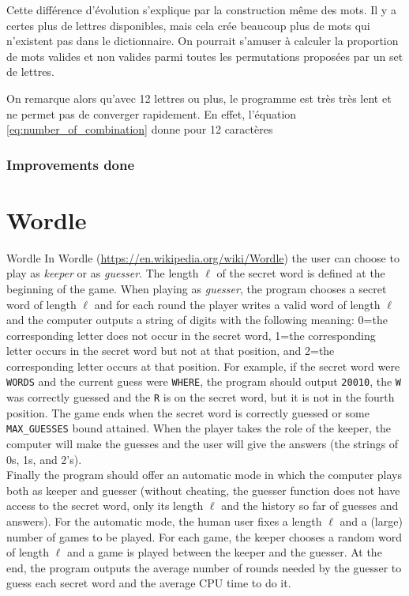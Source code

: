 \documentclass[10pt,a4paper,hidelinks]{article}
\begin{document}

Cette différence d'évolution s'explique par la construction même des mots. Il y a certes plus de lettres disponibles, mais cela crée beaucoup plus de mots qui n'existent pas dans le dictionnaire. On pourrait s'amuser à calculer la proportion de mots valides et non valides parmi toutes les permutations proposées par un set de lettres.

On remarque alors qu'avec 12 lettres ou plus, le programme est très très lent et ne permet pas de converger rapidement. En effet, l'équation \ref{eq:number_of_combination} donne pour 12 caractères 
\subsubsection{Improvements done}

\section{Wordle}
\begin{exercise_description}{Wordle}
    In Wordle (\url{https://en.wikipedia.org/wiki/Wordle}) the user can choose to play as \textit{keeper} or as \textit{guesser}. The length $\ell$ of the secret word is defined at the beginning of the game. When playing as \textit{guesser}, the program chooses a secret word of length $\ell$ and for each round the player writes a valid word of length $\ell$ and the computer outputs a string of digits with the following meaning: 0=the corresponding letter does not occur in the secret word, 1=the corresponding letter occurs in the secret word but not at that position, and 2=the corresponding letter occurs at that position. For example, if the secret word were \verb|WORDS| and the current guess were \verb|WHERE|, the program should output \verb|20010|, the \verb|W| was correctly guessed and the \verb|R| is on the secret word, but it is not in the fourth position. The game ends when the secret word is correctly guessed or some \verb|MAX_GUESSES| bound attained. When the player takes the role of the keeper, the computer will make the guesses and the user will give the answers (the strings of 0s, 1s, and 2's).\\

    Finally the program should offer an automatic mode in which the computer plays both as keeper and guesser (without cheating, the guesser function does not have access to the secret word, only its length $\ell$ and the history so far of guesses and answers). For the automatic mode, the human user fixes a length $\ell$ and a (large) number of games to be played. For each game, the keeper chooses a random word of length $\ell$ and a game is played between the keeper and the guesser. At the end, the program outputs the average number of rounds needed by the guesser to guess each secret word and the average CPU time to do it.     
\end{exercise_description}
\end{document}

